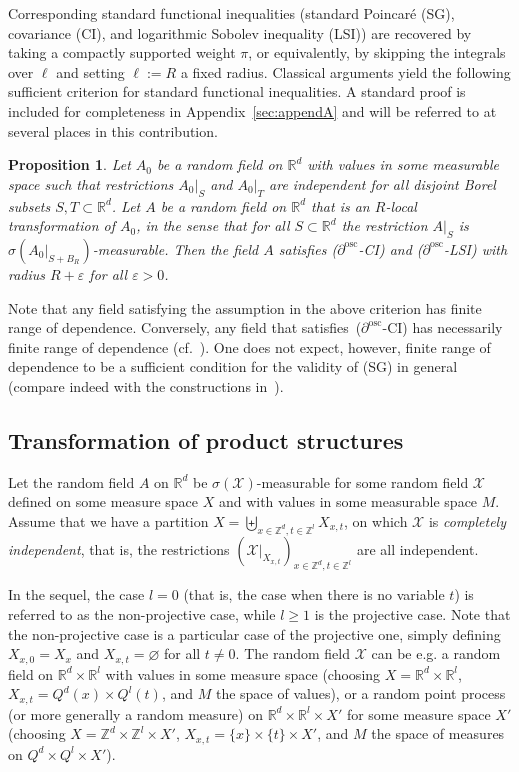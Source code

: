 \documentclass[11pt]{article}
\newtheorem{prop}[theo]{Proposition}
\theoremstyle{definition}
\numberwithin{equation}{section}
\numberwithin{figure}{section}
\numberwithin{table}{section}
\newcommand{\R}{\mathbb R}
\newcommand{\Z}{\mathbb Z}
\newcommand{\X}{\mathcal X}
\newcommand{\e}{\varepsilon}
\newcommand{\osc}{\partial^{\mathrm{osc}}}
\newcommand*{\MK}{\mkern 2mu}
\begin{document}
Corresponding standard functional inequalities (standard Poincaré (SG), covariance (CI), and logarith\-mic Sobo\-lev inequality (LSI)) are recovered by taking a compactly supported weight $\pi$, or equivalently, by skipping the integrals over $\ell$ and setting $\ell:=R$ a fixed radius. Classical arguments yield the following sufficient criterion for standard functional inequalities. A standard proof is included for completeness in Appendix~\ref{sec:appendA} and will be referred to at several places in this contribution.

\begin{prop}\label{prop:criMSG}
Let $A_0$ be a random field on $\R^d$ with values in some measurable space such that restrictions $A_0|_{S}$ and $A_0|_T$ are independent for all disjoint Borel subsets $S,T\subset\R^d$. Let $A$ be a random field on $\R^d$ that is an $R$-local transformation of $A_0$, in the sense that for all $S\subset\R^d$ the restriction $A|_{S}$ is $\sigma(A_0|_{S+B_{R}})$-measurable. Then the field $A$ satisfies \emph{($\osc$-CI)} and \emph{($\osc$-LSI)} with radius $R+\e$ for all $\e>0$.
\end{prop}

Note that any field satisfying the assumption in the above criterion has finite range of dependence. Conversely, any field that satisfies~($\osc$-CI) has necessarily finite range of dependence (cf.~\cite[Proposition~1.4$\MK$(iv)]{DG1}). One does not expect, however, finite range of dependence to be a sufficient condition for the validity of (SG) in general (compare indeed with the constructions in~\cite{Burton-Goulet-Meester-93,Bradley-94}).


\subsection{Transformation of product structures}\label{eq:transfiid}

Let the random field $A$ on $\R^d$ be $\sigma(\X)$-measurable for some random field $\X$ defined on some measure space $X$ and with values in some measurable space $M$. Assume that we have a partition $X=\biguplus_{x\in\Z^d,t\in\Z^l}X_{x,t}$, on which $\X$ is \emph{completely independent}, that is, the restrictions $(\X|_{X_{x,t}})_{x\in\Z^d,t\in\Z^l}$ are all independent.


In the sequel, the case $l=0$ (that is, the case when there is no variable $t$) is referred to as the non-projective case, while $l\ge1$ is the projective case. Note that the non-projective case is a particular case of the projective one, simply defining $X_{x,0}=X_x$ and $X_{x,t}=\varnothing$ for all $t\ne0$. The random field $\X$ can be e.g. a random field on $\R^d\times\R^l$ with values in some measure space (choosing $X=\R^d\times\R^l$, $X_{x,t}=Q^d(x)\times Q^l(t)$, and $M$ the space of values), or a random point process (or more generally a random measure) on $\R^d\times\R^l\times X'$ for some measure space $X'$ (choosing $X=\Z^d\times\Z^l\times X'$, $X_{x,t}=\{x\}\times\{t\}\times X'$, and $M$ the space of measures on $Q^d\times Q^l\times X'$).
\end{document}
